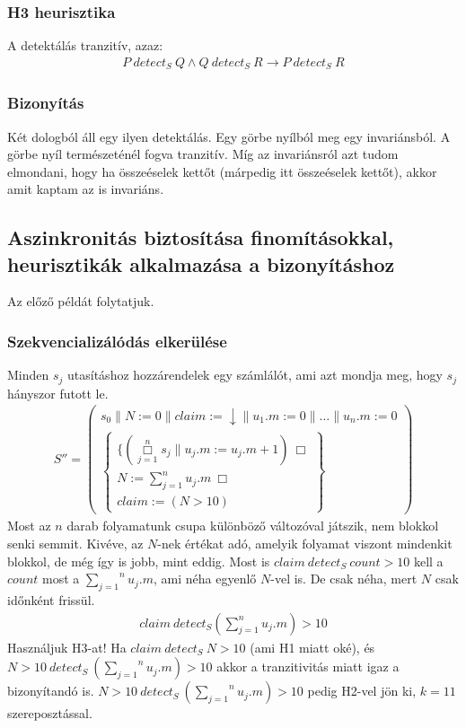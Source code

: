 \documentclass{article}
\newcommand{\false}{\downarrow}
\newcommand{\pp}{\parallel}
\begin{document}
\subsubsection*{H3 heurisztika}
A detektálás tranzitív, azaz: 
\begin{align*}
P\ detect_S\ Q \land Q\ detect_S\ R \rightarrow P\ detect_S\ R
\end{align*}
\subsubsection*{Bizonyítás}
Két dologból áll egy ilyen detektálás. Egy görbe nyílból meg egy invariánsból. A görbe nyíl természeténél fogva tranzitív. Míg az invariánsról azt tudom elmondani, hogy ha összeéselek kettőt (márpedig itt összeéselek kettőt), akkor amit kaptam az is invariáns.
\newpage
\subsection{Aszinkronitás biztosítása finomításokkal, heurisztikák alkalmazása a bizonyításhoz}
Az előző példát folytatjuk.
\subsubsection*{Szekvencializálódás elkerülése}
Minden $s_j$ utasításhoz hozzárendelek egy számlálót, ami azt mondja meg, hogy $s_j$ hányszor futott le. 
\begin{align*}
S''=\left( \begin{array}{l}
s_0\pp N:=0 \pp claim:=\false \pp u_1.m:=0 \pp \dots \pp u_n.m:=0\\
\left\{ \begin{array}{l}
\lbrace (\overset{n}{\underset{j=1}{\Box}} s_j \pp u_j.m:=u_j.m+1)\ \Box\\ N:= \sum_{j=1}^{n}u_j.m\ \Box\\ claim:=(N>10)
\end{array}\right\}
\end{array}\right)
\end{align*}
Most az $n$ darab folyamatunk csupa különböző változóval játszik, nem blokkol senki semmit. Kivéve, az $N$-nek értékat adó, amelyik folyamat viszont mindenkit blokkol, de még így is jobb, mint eddig. Most is $claim\ detect_S\ count > 10$ kell a $count$ most a $\overset{n}{\underset{j=1}{\sum}} u_j.m$, ami néha egyenlő $N$-vel is. De csak néha, mert $N$ csak időnként frissül.
\begin{align*}
claim\ detect_S(\sum_{j=1}^{n} u_j.m)>10
\end{align*}
Használjuk H3-at! Ha $claim\ detect_S\ N>10$ (ami H1 miatt oké), és $N>10\ detect_S\ (\overset{n}{\underset{j=1}{\sum}} u_j.m)>10$ akkor a tranzitivitás miatt igaz a bizonyítandó is. $N>10\ detect_S\ (\overset{n}{\underset{j=1}{\sum}} u_j.m)>10$ pedig H2-vel jön ki, $k=11$ szereposztással.
\end{document}

